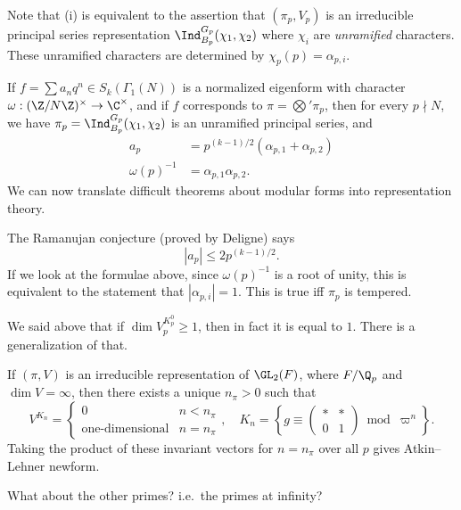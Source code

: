 \documentclass[a4paper]{article}
\begin{document}
Note that (i) is equivalent to the assertion that $(\pi_p, V_p)$ is an irreducible principal series representation $\Ind_{B_p}^{G_p} (\chi_1, \chi_2)$ where $\chi_i$ are \emph{unramified} characters. These unramified characters are determined by $\chi_p(p) = \alpha_{p, i}$.

If $f = \sum a_n q^n \in S_k(\Gamma_1(N))$ is a normalized eigenform with character $\omega: (\Z/N\Z)^\times \to \C^\times$, and if $f$ corresponds to $\pi = \bigotimes' \pi_p$, then for every $p \nmid N$, we have $\pi_p = \Ind_{B_p}^{G_p}(\chi_1, \chi_2)$ is an unramified principal series, and
\begin{align*}
  a_p &= p^{(k - 1)/2} (\alpha_{p, 1} + \alpha_{p, 2})\\
  \omega(p)^{-1} &= \alpha_{p, 1} \alpha_{p, 2}.
\end{align*}
We can now translate difficult theorems about modular forms into representation theory.
\begin{eg}
  The Ramanujan conjecture (proved by Deligne) says
  \[
    |a_p| \leq 2 p^{(k - 1)/2}.
  \]
  If we look at the formulae above, since $\omega(p)^{-1}$ is a root of unity, this is equivalent to the statement that $|\alpha_{p, i}| = 1$. This is true iff $\pi_p$ is tempered.
\end{eg}

We said above that if $\dim V_p^{K_p^0} \geq 1$, then in fact it is equal to $1$. There is a generalization of that.

\begin{thm}
  If $(\pi, V)$ is an irreducible representation of $\GL_2(F)$, where $F/\Q_p$ and $\dim V = \infty$, then there exists a unique $n_\pi > 0$ such that
  \[
    V^{K_n} =
    \begin{cases}
      0 & n < n_\pi\\
      \text{one-dimensional} & n = n_\pi
    \end{cases},\quad K_n = \left\{
      g \equiv
      \begin{pmatrix}
        * & *\\
        0 & 1
      \end{pmatrix}\bmod \varpi^n
    \right\}.
  \]
  Taking the product of these invariant vectors for $n = n_\pi$ over all $p$ gives Atkin--Lehner newform.
\end{thm}

What about the other primes? i.e.\ the primes at infinity?
\end{document}
